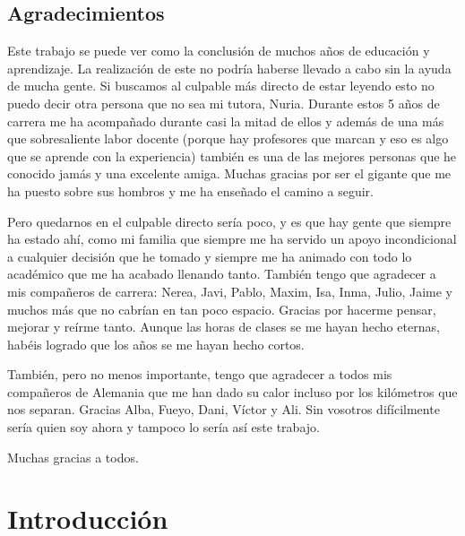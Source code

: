 \documentclass[oneside,openright,titlepage,numbers=noenddot,openany,headinclude,footinclude=true,
cleardoublepage=empty,abstractoff,BCOR=5mm,paper=a4,fontsize=12pt,main=spanish]{scrreprt}
\begin{document}
\chapter*{Agradecimientos}
\begin{flushleft}
Este trabajo se puede ver como la conclusión de muchos años de educación y aprendizaje. La realización de este no podría haberse llevado a cabo sin la ayuda de mucha gente. Si buscamos al culpable más directo de estar leyendo esto no puedo decir otra persona que no sea mi tutora, Nuria. Durante estos 5 años de carrera me ha acompañado durante casi la mitad de ellos y además de una más que sobresaliente labor docente (porque hay profesores que marcan y eso es algo que se aprende con la experiencia) también es una de las mejores personas que he conocido jamás y una excelente amiga. Muchas gracias por ser el gigante que me ha puesto sobre sus hombros y me ha enseñado el camino a seguir.

Pero quedarnos en el culpable directo sería poco, y es que hay gente que siempre ha estado ahí, como mi familia que siempre me ha servido un apoyo incondicional a cualquier decisión que he tomado y siempre me ha animado con todo lo académico que me ha acabado llenando tanto. También tengo que agradecer a mis compañeros de carrera: Nerea, Javi, Pablo, Maxim, Isa, Inma, Julio, Jaime y muchos más que no cabrían en tan poco espacio. Gracias por hacerme pensar, mejorar y reírme tanto. Aunque las horas de clases se me hayan hecho eternas, habéis logrado que los años se me hayan hecho cortos.

También, pero no menos importante, tengo que agradecer a todos mis compañeros de Alemania que me han dado su calor incluso por los kilómetros que nos separan. Gracias Alba, Fueyo, Dani, Víctor y Ali. Sin vosotros difícilmente sería quien soy ahora y tampoco lo sería así este trabajo.

Muchas gracias a todos.
\end{flushleft}














\part{Introducción}
\end{document}
